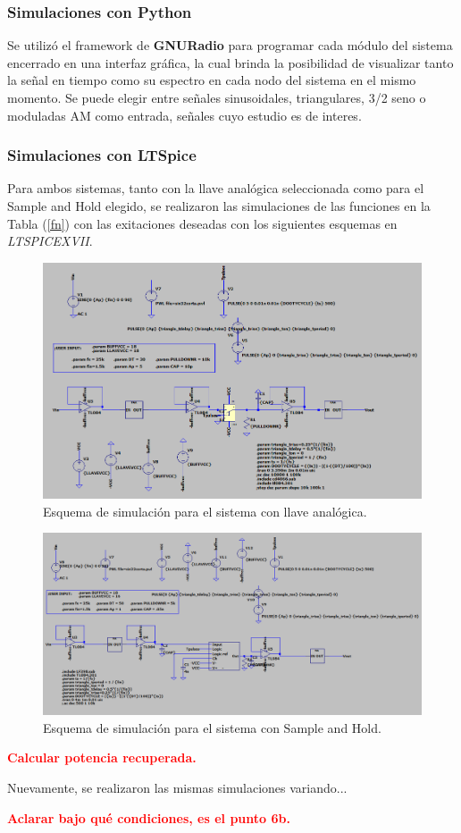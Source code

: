 \subsubsection{Simulaciones con Python}
Se utilizó el framework de \textbf{GNURadio} para programar cada módulo del sistema encerrado en una interfaz gráfica, la cual brinda la posibilidad de visualizar tanto la señal en tiempo como su espectro en cada nodo del sistema en el mismo momento. Se puede elegir entre señales sinusoidales, triangulares, 3/2 seno o moduladas AM como entrada, señales cuyo estudio es de interes.

\subsubsection{Simulaciones con LTSpice}
Para ambos sistemas, tanto con la llave analógica seleccionada como para el Sample and Hold elegido, se realizaron las simulaciones de las funciones en la Tabla (\ref{fn}) con las exitaciones deseadas con los siguientes esquemas en \textit{LTSPICEXVII}.

\begin{figure}[H]
\centering
\includegraphics[width=\textwidth]{ImagenesEjercicio6/SIMULACIONLLAVE.png}
\caption{Esquema de simulación para el sistema con llave analógica.}
\end{figure}

\begin{figure}[H]
\centering
\includegraphics[width=\textwidth]{ImagenesEjercicio6/SIMULACIONSH.png}
\caption{Esquema de simulación para el sistema con Sample and Hold.}
\end{figure}

\textcolor{red}{\textbf{Calcular potencia recuperada.}}

Nuevamente, se realizaron las mismas simulaciones variando...

\textcolor{red}{\textbf{Aclarar bajo qué condiciones, es el punto 6b.}}


